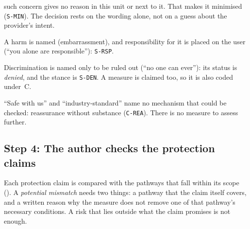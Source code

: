 \begin{description}[leftmargin=0pt,itemsep=3pt]
{    such concern} gives no reason in this unit or next to it. That makes it
    minimised (\texttt{S-MIN}). The decision rests on the wording alone, not
    on a guess about the provider's intent.
  \item[U8.] A harm is named (embarrassment), and responsibility for it is
    placed on the user (\enquote{you alone are responsible}): \texttt{S-RSP}.
  \item[U9.] Discrimination is named only to be ruled out (\enquote{no one can
    ever}): its status is \emph{denied}, and the stance is \texttt{S-DEN}. A
    measure is claimed too, so it is also coded under~C.
  \item[U10.] \enquote{Safe with us} and \enquote{industry-standard} name no
    mechanism that could be checked: reassurance without substance
    (\texttt{C-REA}). There is no measure to assess further.
\end{description}

\subsection*{Step 4: The author checks the protection claims}

Each protection claim is compared with the pathways that fall within its
scope (). A \emph{potential mismatch} needs two things:
a pathway that the claim itself covers, and a written reason why the measure
does not remove one of that pathway's necessary conditions. A risk that lies
outside what the claim promises is not enough.

